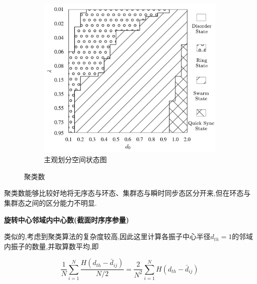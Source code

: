 \documentclass{article}
\begin{document}
\begin{figure}[H]
\begin{subfigure}[b]{0.49\textwidth}
		\includegraphics[width=\textwidth]{./figs/subjectiveOp3.png}
		\vspace{-1cm}
		\caption{主观划分空间状态图}
	\end{subfigure}

	\vspace{-0.5cm}
	\caption{聚类数}
	\label{fig:fig234c.7}
\end{figure}

聚类数能够比较好地将无序态与环态、集群态与瞬时同步态区分开来,但在环态与集群态之间的区分能力不明显.

\noindent\textbf{旋转中心邻域内中心数(截面时序序参量)}

类似的,考虑到聚类算法的复杂度较高,因此这里计算各振子中心半径$d_{th}=1$的邻域内振子的数量,并取算数平均,即

$$
\frac{1}{N}\sum_{i=1}^N{\frac{H\left( d_{th}-\bar{d}_{ij} \right)}{N/2}}=\frac{2}{N^2}\sum_{i=1}^N{H\left( d_{th}-\bar{d}_{ij} \right)}
$$
\end{document}
